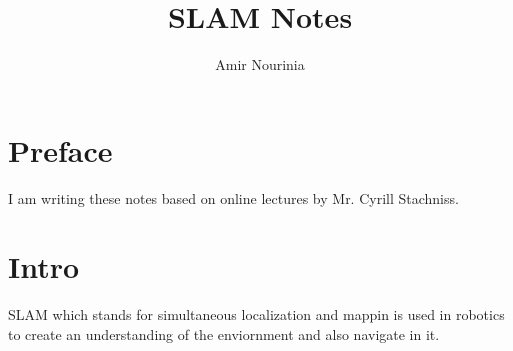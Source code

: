 \documentclass[11pt,twoside,a4paper]{report}
\title{SLAM Notes}
\author{Amir Nourinia}
\begin{document}
    \maketitle
    \tableofcontents


    \section{Preface}
    I am writing these notes based on online lectures by Mr. Cyrill Stachniss.

    \section{Intro}
    
    
    SLAM which stands for simultaneous localization and mappin is used in robotics to create an understanding of the enviornment and also navigate in it.
    
\end{document}
